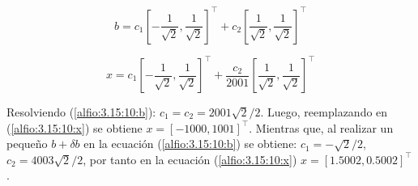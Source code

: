 \begin{equation}
    b = c_1 \left[-\frac{1}{\sqrt{2}}, \frac{1}{\sqrt{2}} \right]^{\intercal} + c_2 \left[ \frac{1}{\sqrt{2}}, \frac{1}{\sqrt{2}}\right]^{\intercal}
    \label{alfio:3.15:10:b}
\end{equation}

\begin{equation}
    x = c_1 \left[-\frac{1}{\sqrt{2}}, \frac{1}{\sqrt{2}} \right]^{\intercal} + \frac{c_2}{2001} \left[ \frac{1}{\sqrt{2}}, \frac{1}{\sqrt{2}}\right]^{\intercal}
    \label{alfio:3.15:10:x}
\end{equation}

Resolviendo (\ref{alfio:3.15:10:b}): $c_1 = c_2 = 2001 \sqrt{2}/2$. Luego, reemplazando en (\ref{alfio:3.15:10:x}) se obtiene $x = [-1000,1001]^\intercal$. Mientras que, al realizar un pequeño $b+\delta b$ en la ecuación (\ref{alfio:3.15:10:b}) se obtiene:  $c_1=-\sqrt{2}/2$, $c_2 = 4003\sqrt{2}/2$, por tanto en la ecuación (\ref{alfio:3.15:10:x}) $x = [1.5002,0.5002]^\intercal$.
